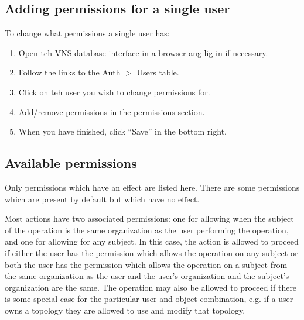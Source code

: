 \documentclass[a4paper,12pt]{report}
\begin{document}
\subsection{Adding permissions for a single user}
To change what permissions a single user has:
\begin{enumerate}
\item Open teh VNS database interface in a browser ang lig in if necessary.
\item Follow the links to the Auth $>$ Users table.
\item Click on teh user you wish to change permissions for.
\item Add/remove permissions in the permissions section.
\item When you have finished, click ``Save'' in the bottom right.
\end{enumerate}

\subsection{Available permissions}
Only permissions which have an effect are listed here.  There are some permissions which are present by default but which have no effect.

Most actions have two associated permissions: one for allowing when the subject of the operation is the same organization as the user performing the operation, and one for allowing for any subject.  In this case, the action is allowed to proceed if either the user has the permission which allows the operation on any subject or both the user has the permission which allows the operation on a subject from the same organization as the user and the user's organization and the subject's organization are the same.  The operation may also be allowed to proceed if there is some special case for the particular user and object combination, e.g. if a user owns a topology they are allowed to use and modify that topology.
\end{document}
